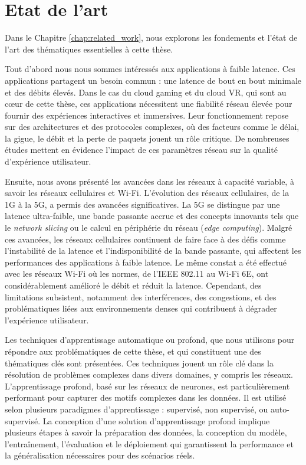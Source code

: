 \section*{Etat de l'art}
Dans le Chapitre \ref{chap:related_work}, nous explorons les fondements et l'état de l'art des thématiques essentielles à cette thèse.

Tout d'abord nous nous sommes intéressés aux applications à faible latence. Ces applications  partagent un besoin commun : une latence de bout en bout minimale et des débits élevés. Dans le cas du cloud gaming et du cloud VR, qui sont au cœur de cette thèse, ces applications nécessitent une fiabilité réseau élevée pour fournir des expériences interactives et immersives. Leur fonctionnement repose sur des architectures et des protocoles complexes, où des facteurs comme le délai, la gigue, le débit et la perte de paquets jouent un rôle critique. De nombreuses études mettent en évidence l'impact de ces paramètres réseau sur la qualité d'expérience utilisateur.

Ensuite, nous avons présenté les avancées dans les réseaux à capacité variable, à savoir les réseaux cellulaires et Wi-Fi. L'évolution des réseaux cellulaires, de la 1G à la 5G, a permis des avancées significatives. La 5G se distingue par une latence ultra-faible, une bande passante accrue et des concepts innovants tels que le \textit{network slicing} ou le calcul en périphérie du réseau (\textit{edge computing}). Malgré ces avancées, les réseaux cellulaires continuent de faire face à des défis comme l’instabilité de la latence et l’indisponibilité de la bande passante, qui affectent les performances des applications à faible latence. Le même constat a été effectué avec les réseaux Wi-Fi où les normes, de l’IEEE 802.11 au Wi-Fi 6E, ont considérablement amélioré le débit et réduit la latence. Cependant, des limitations subsistent, notamment des interférences, des congestions, et des problématiques liées aux environnements denses qui contribuent à dégrader l'expérience utilisateur.

Les techniques d'apprentissage automatique ou profond, que nous utilisons pour répondre aux problématiques de cette thèse, et qui constituent une des thématiques clés sont présentées. Ces techniques jouent un rôle clé dans la résolution de problèmes complexes dans divers domaines, y compris les réseaux. L'apprentissage profond, basé sur les réseaux de neurones, est particulièrement performant pour capturer des motifs complexes dans les données. Il est utilisé selon plusieurs paradigmes d’apprentissage : supervisé, non supervisé, ou auto-supervisé. La conception d'une solution d'apprentissage profond implique plusieurs étapes à savoir la préparation des données, la conception du modèle, l'entraînement, l'évaluation et le déploiement qui garantissent la performance et la généralisation nécessaires pour des scénarios réels.

